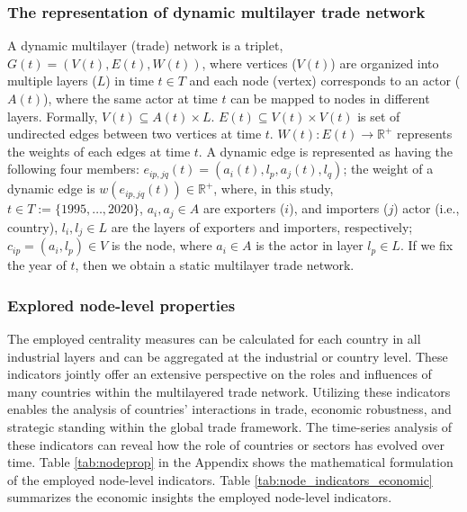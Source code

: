 \documentclass[preprint, 3p,
authoryear]{elsarticle} %
\begin{document}
\subsubsection{The representation of dynamic multilayer trade
network}\label{the-representation-of-dynamic-multilayer-trade-network}

A dynamic multilayer (trade) network is a triplet,
\(G(t)=(V(t),E(t),W(t))\), where vertices (\(V(t)\)) are organized into
multiple layers (\(L\)) in time \(t\in T\) and each node (vertex)
corresponds to an actor (\(A(t)\)), where the same actor at time \(t\)
can be mapped to nodes in different layers. Formally,
\(V(t) \subseteq A(t) \times L\). \(E(t) \subseteq V(t) \times V(t)\) is
set of undirected edges between two vertices at time \(t\).
\(W(t) : E(t) \rightarrow \mathbb{R}^+\) represents the weights of each
edges at time \(t\). A dynamic edge is represented as having the
following four members: \(e_{ip,jq}(t)=(a_i(t),l_p,a_j(t),l_q)\); the
weight of a dynamic edge is \(w(e_{ip,jq}(t)) \in \mathbb{R}^+\), where,
in this study, \(t\in T:=\{1995,\ldots,2020\}\), \(a_i,a_j\in A\) are
exporters (\(i\)), and importers (\(j\)) actor (i.e., country),
\(l_i,l_j\in L\) are the layers of exporters and importers,
respectively; \(c_{ip} =(a_i,l_p) \in V\) is the node, where
\(a_i \in A\) is the actor in layer \(l_p\in L\). If we fix the year of
\(t\), then we obtain a static multilayer trade network.

\subsubsection{Explored node-level properties}\label{sec:methodnodep}

The employed centrality measures can be calculated for each country in
all industrial layers and can be aggregated at the industrial or country
level. These indicators jointly offer an extensive perspective on the
roles and influences of many countries within the multilayered trade
network. Utilizing these indicators enables the analysis of countries'
interactions in trade, economic robustness, and strategic standing
within the global trade framework. The time-series analysis of these
indicators can reveal how the role of countries or sectors has evolved
over time. Table \ref{tab:nodeprop} in the Appendix shows the
mathematical formulation of the employed node-level indicators. Table
\ref{tab:node_indicators_economic} summarizes the economic insights the
employed node-level indicators.
\end{document}
